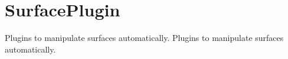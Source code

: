 \hypertarget{group___surface_plugin}{
\section{SurfacePlugin}
\label{group___surface_plugin}
}


Plugins to manipulate surfaces automatically.  
Plugins to manipulate surfaces automatically. 